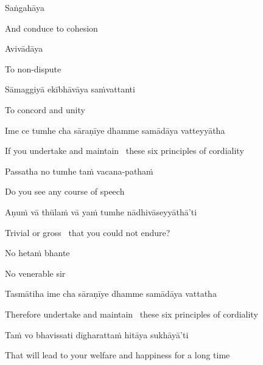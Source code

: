 Saṅgahāya

\begin{english}
  And conduce to cohesion
\end{english}

Avivādāya

\begin{english}
  To non-dispute
\end{english}

Sāmaggiyā ekībhāvāya saṁvattanti

\begin{english}
  To concord and unity
\end{english}

\suttaRef{[MN 48]}

Ime ce tumhe cha sāraṇīye dhamme samādāya vatteyyātha

\begin{english}
  If you undertake and maintain \breathmark\ these six principles of cordiality
\end{english}

Passatha no tumhe taṁ vacana-pathaṁ

\begin{english}
  Do you see any course of speech
\end{english}

Aṇuṁ vā thūlaṁ vā yaṁ tumhe nādhivāseyyāthā'ti

\begin{english}
  Trivial or gross \breathmark\ that you could not endure?
\end{english}

No hetaṁ bhante

\begin{english}
  No venerable sir
\end{english}

Tasmātiha ime cha sāraṇīye dhamme samādāya vattatha

\begin{english}
  Therefore undertake and maintain \breathmark\ these six principles of cordiality
\end{english}

Taṁ vo bhavissati dīgharattaṁ hitāya sukhāyā'ti

\begin{english}
  That will lead to your welfare and happiness for a long time
\end{english}

\suttaRef{[MN 104]}


